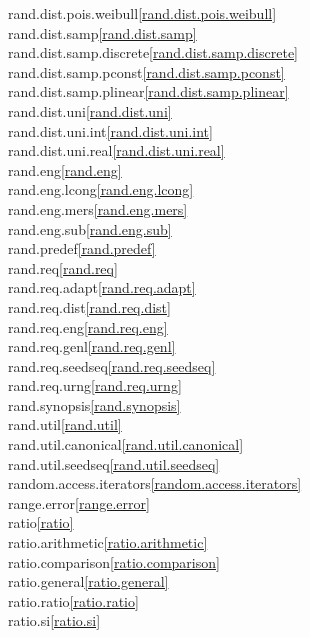 \begin{multicols}{2}
rand.dist.pois.weibull\quad\ref{rand.dist.pois.weibull}\\
rand.dist.samp\quad\ref{rand.dist.samp}\\
rand.dist.samp.discrete\quad\ref{rand.dist.samp.discrete}\\
rand.dist.samp.pconst\quad\ref{rand.dist.samp.pconst}\\
rand.dist.samp.plinear\quad\ref{rand.dist.samp.plinear}\\
rand.dist.uni\quad\ref{rand.dist.uni}\\
rand.dist.uni.int\quad\ref{rand.dist.uni.int}\\
rand.dist.uni.real\quad\ref{rand.dist.uni.real}\\
rand.eng\quad\ref{rand.eng}\\
rand.eng.lcong\quad\ref{rand.eng.lcong}\\
rand.eng.mers\quad\ref{rand.eng.mers}\\
rand.eng.sub\quad\ref{rand.eng.sub}\\
rand.predef\quad\ref{rand.predef}\\
rand.req\quad\ref{rand.req}\\
rand.req.adapt\quad\ref{rand.req.adapt}\\
rand.req.dist\quad\ref{rand.req.dist}\\
rand.req.eng\quad\ref{rand.req.eng}\\
rand.req.genl\quad\ref{rand.req.genl}\\
rand.req.seedseq\quad\ref{rand.req.seedseq}\\
rand.req.urng\quad\ref{rand.req.urng}\\
rand.synopsis\quad\ref{rand.synopsis}\\
rand.util\quad\ref{rand.util}\\
rand.util.canonical\quad\ref{rand.util.canonical}\\
rand.util.seedseq\quad\ref{rand.util.seedseq}\\
random.access.iterators\quad\ref{random.access.iterators}\\
range.error\quad\ref{range.error}\\
ratio\quad\ref{ratio}\\
ratio.arithmetic\quad\ref{ratio.arithmetic}\\
ratio.comparison\quad\ref{ratio.comparison}\\
ratio.general\quad\ref{ratio.general}\\
ratio.ratio\quad\ref{ratio.ratio}\\
ratio.si\quad\ref{ratio.si}\\

\end{multicols}
